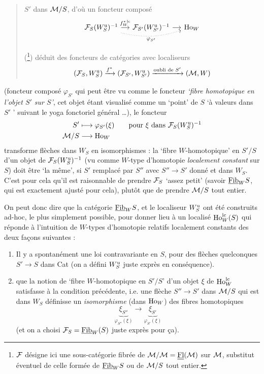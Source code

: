 \begin{quote}
$S'$ dans $\mathcal{M}/S$, d'où un foncteur composé
\[
\begin{tikzcd}[column sep=small]
\cF_S(\Wu_S)^{-1} \arrow[r, "f^{*\,\lc}_W"] \arrow[rr, dotted, bend right=15, "\varphi_{S'}"'] & \cF_{S'}(\Wu_{S'})^{-1} \arrow[r] & \Ho_W
\end{tikzcd}
\]

(\footnote[121]{$\mathcal{F}$ désigne ici une sous-catégorie fibrée de $\mathcal{M}/\mathcal{M} = \underline{\underline{\mathrm{Fl}}}(\mathcal{M})$ sur $\mathcal{M}$, substitut éventuel de celle formée de $\underline{\mathrm{Fib}}_W S$ ou de $\mathcal{M}/S$ tout entier.}) déduit des foncteurs de catégories avec localiseurs
\[
(\mathcal{F}_S, W^{\mathrm{u}}_S) \xrightarrow{f^*} (\mathcal{F}_{S'}, W^{\mathrm{u}}_{S'}) \xrightarrow{\text{oubli de } S'} (\mathcal{M}, W)
\]
\end{quote}

(foncteur composé $\varphi_{S'}$ qui peut être vu comme le foncteur \textit{‘fibre homotopique en l'objet $S'$ sur $S$’}, cet objet étant visualisé comme un ‘point’ de $S$ ‘à valeurs dans $S'$ ’ suivant le yoga fonctoriel général \dots), le foncteur
\[
\begin{aligned}
S' &\longmapsto \varphi_{S'}(\xi) \qquad \text{pour } \xi \text{ dans } \mathcal{F}_S(W^{\mathrm{u}}_S)^{-1}\\
\mathcal{M}/S &\longrightarrow \mathrm{Ho}_W
\end{aligned}
\]
transforme flèches dans $W_S$ en isomorphismes : la ‘fibre $W$-homotopique’ en $S'/S$ d'un objet de $\mathcal{F}_S(W^{\mathrm{u}}_S)^{-1}$ (vu comme $W$-type d'homotopie \textit{localement constant} sur $S$) doit être ‘la même’, si $S'$ remplacé par $S''$ avec $S'' \longrightarrow S'$ donné et dans $W_S$. C'est pour cela qu'il est raisonnable de prendre $\mathcal{F}_S$ ‘assez petit’ (savoir $\underline{\mathrm{Fib}}_W S$, qui est  exactement ajusté pour cela), plutôt que de prendre $\mathcal{M}/S$ tout entier.

On peut donc dire que la catégorie $\underline{\mathrm{Fib}}_W S$, et le localiseur $W^{\mathrm{u}}_S$ ont été construits ad-hoc, le plus simplement possible, pour donner lieu à un localisé $\mathrm{Ho}^{\mathrm{lc}}_W(S)$ qui réponde à l'intuition de $W$-types d'homotopie relatifs localement constants des deux façons suivantes :

\begin{enumerate}[label={}]
\item[1°)] Il y a spontanément une loi contravariante en $S$, pour des flèches quelconques $S' \longrightarrow S$ dans Cat (on a défini $W^{\mathrm{u}}_S$ juste exprès en conséquence).
\item[2°)] que la notion de ‘fibre $W$-homotopique en $S'/S$’ d'un objet $\xi$ de $\mathrm{Ho}^{\mathrm{lc}}_W$ satisfasse à la condition précédente, i.e. une flèche $S'' \longrightarrow S'$ dans $\mathcal{M}/S$ qui est dans $W_S$ définisse un \textit{isomorphisme} (dans $\mathrm{Ho}_W$) des fibres homotopiques
\[
\underbrace{\xi_{S''}}_{\varphi_{S''}(\xi)} \longrightarrow \underbrace{\xi_{S'}}_{\varphi_{S'}(\xi)}
\]
(et on a choisi $\mathcal{F}_S = \underline{\mathrm{Fib}}_W(S)$ juste exprès pour ça).
\end{enumerate}

